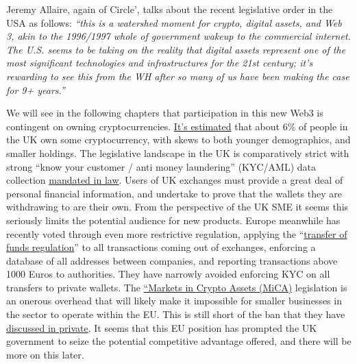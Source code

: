 Jeremy Allaire, again of Circle', talks about the recent legislative order in the USA as follows:
\textit{``this is a watershed moment for crypto, digital assets, and Web 3, akin to the 1996/1997 whole of government wakeup to the commercial internet. The U.S. seems to be taking on the reality that digital assets represent one of the most significant technologies and infrastructures for the 21st century; it's rewarding to see this from the WH after so many of us have been making the case for 9+ years.''}\par
We will see in the following chapters that participation in this new Web3 is contingent on owning cryptocurrencies. \href{https://www.finder.com/uk/cryptocurrency-statistics}{It's estimated} that about 6\% of people in the UK own some cryptocurrency, with skews to both younger demographics, and smaller holdings. The legislative landscape in the UK is comparatively strict with strong ``know your customer / anti money laundering'' (KYC/AML) data collection \href{https://www.gov.uk/guidance/money-laundering-regulations-your-responsibilities}{mandated in law}. Users of UK exchanges must provide a great deal of personal financial information, and undertake to prove that the wallets they are withdrawing to are their own. From the perspective of the UK SME it seems this seriously limits the potential audience for new products. Europe meanwhile has recently voted through even more restrictive regulation, applying the ``\href{https://www.europarl.europa.eu/legislative-train/theme-an-economy-that-works-for-people/file-revision-of-the-regulation-on-transfers-of-funds}{transfer of funds regulation}'' to all transactions coming out of exchanges, enforcing a database of all addresses between companies, and reporting transactions above 1000 Euros to authorities. They have narrowly avoided enforcing KYC on all transfers to private wallets. The \href{https://www.consilium.europa.eu/en/press/press-releases/2022/06/30/digital-finance-agreement-reached-on-european-crypto-assets-regulation-mica/}{``Markets in Crypto Assets (MiCA)} legislation is an onerous overhead that will likely make it impossible for smaller businesses in the sector to operate within the EU. This is still short of the ban that they have \href{https://netzpolitik.org/2022/climate-measures-behind-closed-doors-eu-officials-talk-about-banning-bitcoin/}{discussed in private}. It seems that this EU position has prompted the UK government to seize the potential competitive advantage offered, and there will be more on this later.\par
